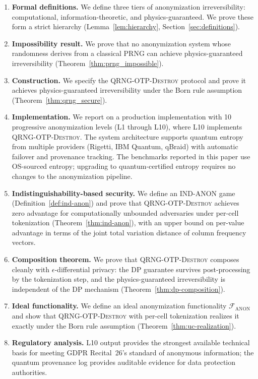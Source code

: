 \documentclass[journal]{IEEEtran}
\begin{document}
\begin{enumerate}
\item \textbf{Formal definitions.} We define three tiers of anonymization irreversibility: computational, information-theoretic, and physics-guaranteed. We prove these form a strict hierarchy (Lemma~\ref{lem:hierarchy}, Section~\ref{sec:definitions}).

\item \textbf{Impossibility result.} We prove that no anonymization system whose randomness derives from a classical PRNG can achieve physics-guaranteed irreversibility (Theorem~\ref{thm:prng_impossible}).

\item \textbf{Construction.} We specify the \textsc{QRNG-OTP-Destroy} protocol and prove it achieves physics-guaranteed irreversibility under the Born rule assumption (Theorem~\ref{thm:qrng_secure}).

\item \textbf{Implementation.} We report on a production implementation with 10 progressive anonymization levels (L1 through L10), where L10 implements \textsc{QRNG-OTP-Destroy}. The system architecture supports quantum entropy from multiple providers (Rigetti, IBM Quantum, qBraid) with automatic failover and provenance tracking. The benchmarks reported in this paper use OS-sourced entropy; upgrading to quantum-certified entropy requires no changes to the anonymization pipeline.

\item \textbf{Indistinguishability-based security.} We define an IND-ANON game (Definition~\ref{def:ind-anon}) and prove that \textsc{QRNG-OTP-Destroy} achieves zero advantage for computationally unbounded adversaries under per-cell tokenization (Theorem~\ref{thm:ind-anon}), with an upper bound on per-value advantage in terms of the joint total variation distance of column frequency vectors.

\item \textbf{Composition theorem.} We prove that \textsc{QRNG-OTP-Destroy} composes cleanly with $\epsilon$-differential privacy: the DP guarantee survives post-processing by the tokenization step, and the physics-guaranteed irreversibility is independent of the DP mechanism (Theorem~\ref{thm:dp-composition}).

\item \textbf{Ideal functionality.} We define an ideal anonymization functionality $\mathcal{F}_{\mathrm{ANON}}$ and show that \textsc{QRNG-OTP-Destroy} with per-cell tokenization realizes it exactly under the Born rule assumption (Theorem~\ref{thm:uc-realization}).

\item \textbf{Regulatory analysis.} L10 output provides the strongest available technical basis for meeting GDPR Recital~26's standard of anonymous information; the quantum provenance log provides auditable evidence for data protection authorities.
\end{enumerate}
\end{document}

